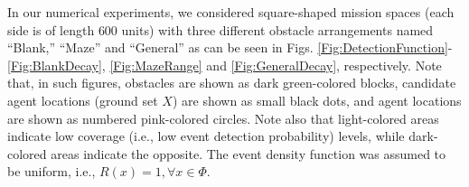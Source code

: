 \documentclass[letterpaper, 10 pt, conference]{ieeeconf}
\begin{document}


In our numerical experiments, we considered square-shaped mission spaces (each side is of length $600$ units) with three different obstacle arrangements named ``Blank,'' ``Maze'' and ``General'' as can be seen in Figs. \ref{Fig:DetectionFunction}-\ref{Fig:BlankDecay}, \ref{Fig:MazeRange} and \ref{Fig:GeneralDecay}, respectively. Note that, in such figures, obstacles are shown as dark green-colored blocks, candidate agent locations (ground set $X$) are shown as small black dots, and agent locations are shown as numbered pink-colored circles. Note also that light-colored areas indicate low coverage (i.e., low event detection probability) levels, while dark-colored areas indicate the opposite. The event density function was assumed to be uniform, i.e., $R(x) = 1, \forall x\in \Phi$.  
\end{document}
